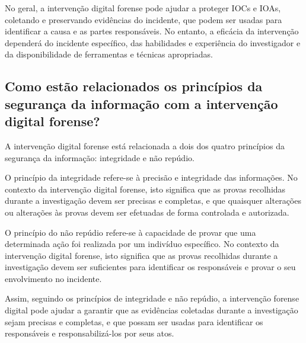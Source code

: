 No geral, a intervenção digital forense pode ajudar a proteger IOCs e IOAs, coletando e preservando evidências do incidente, que podem ser usadas para identificar a causa e as partes responsáveis. No entanto, a eficácia da intervenção dependerá do incidente específico, das habilidades e experiência do investigador e da disponibilidade de ferramentas e técnicas apropriadas.

\subsection[Extensão da pergunta 4]{Como estão relacionados os princípios da segurança da informação com a intervenção digital forense?}

A intervenção digital forense está relacionada a dois dos quatro princípios da segurança da informação: integridade e não repúdio.

O princípio da integridade refere-se à precisão e integridade das informações. No contexto da intervenção digital forense, isto significa que as provas recolhidas durante a investigação devem ser precisas e completas, e que quaisquer alterações ou alterações às provas devem ser efetuadas de forma controlada e autorizada.

O princípio do não repúdio refere-se à capacidade de provar que uma determinada ação foi realizada por um indivíduo específico. No contexto da intervenção digital forense, isto significa que as provas recolhidas durante a investigação devem ser suficientes para identificar os responsáveis e provar o seu envolvimento no incidente.

Assim, seguindo os princípios de integridade e não repúdio, a intervenção forense digital pode ajudar a garantir que as evidências coletadas durante a investigação sejam precisas e completas, e que possam ser usadas para identificar os responsáveis e responsabilizá-los por seus atos.

\newpage

